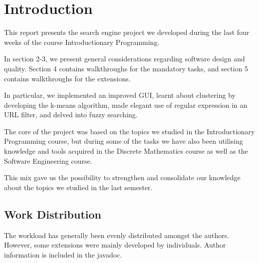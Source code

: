 \section{Introduction}
This report presents the search engine project we developed during the last four weeks of the course Introductionary Programming.

In section 2-3, we present general considerations regarding software design and quality. Section 4 contains walkthroughs for the mandatory tasks, and section 5 contains walkthroughs for the extensions.

In particular, we implemented an improved GUI, learnt about clustering by developing the k-means algorithm, made elegant use of regular expression in an URL filter, and delved into fuzzy searching.

The core of the project was based on the topics we studied in the Introductionary Programming course, but during some of the tasks we have also been utilising  knowledge and tools acquired in the Discrete Mathematics course as well as the Software Engineering course.

This mix gave us the possibility to strengthen and consolidate our knowledge about the topics we studied in the last semester.

\subsection{Work Distribution}
The workload has generally been evenly distributed amongst the authors. However, some extensions were mainly developed by individuals. Author information is included in the javadoc.